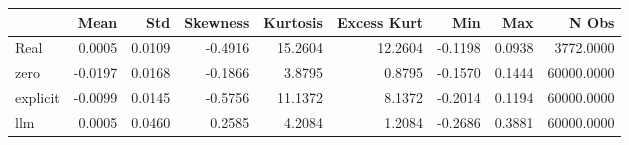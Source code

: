 \begin{tabular}{lrrrrrrrr}
\toprule
 & Mean & Std & Skewness & Kurtosis & Excess Kurt & Min & Max & N Obs \\
\midrule
Real & 0.0005 & 0.0109 & -0.4916 & 15.2604 & 12.2604 & -0.1198 & 0.0938 & 3772.0000 \\
zero & -0.0197 & 0.0168 & -0.1866 & 3.8795 & 0.8795 & -0.1570 & 0.1444 & 60000.0000 \\
explicit & -0.0099 & 0.0145 & -0.5756 & 11.1372 & 8.1372 & -0.2014 & 0.1194 & 60000.0000 \\
llm & 0.0005 & 0.0460 & 0.2585 & 4.2084 & 1.2084 & -0.2686 & 0.3881 & 60000.0000 \\
\bottomrule
\end{tabular}
